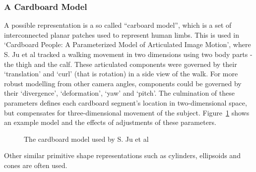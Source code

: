 \subsubsection{A Cardboard Model}

A possible representation is a so called ``carboard model'', which is a set of interconnected planar patches used to represent human limbs. This is used in `Cardboard People: A Parameterized Model of Articulated Image Motion'\cite{cardboardpeople}, where S. Ju et al tracked a walking movement in two dimensions using two body parts - the thigh and the calf. These articulated components were governed by their `translation' and `curl' (that is rotation) in a side view of the walk. For more robust modelling from other camera angles, components could be governed by their `divergence', `deformation', `yaw' and `pitch'. The culmination of these parameters defines each cardboard segment's location in two-dimensional space, but compensates for three-dimensional movement of the subject. Figure~\ref{fig:cardboardmodel} shows an example model and the effects of adjustments of these parameters.

\begin{figure}[H]
    \centering
\caption{The cardboard model used by S. Ju et al\cite{cardboardpeople}}
\label{fig:cardboardmodel}
\end{figure}

Other similar primitive shape representations such as cylinders, ellipsoids and cones are often used\cite{cvmocapsurvey}.